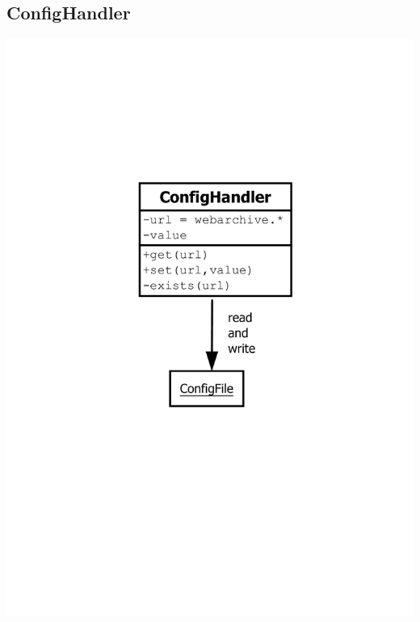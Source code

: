 \subsection{ConfigHandler}
\includegraphics[width=\textwidth]{design/backend/gfx/ConfigHandler.pdf}
\label{sub:confighandler}
